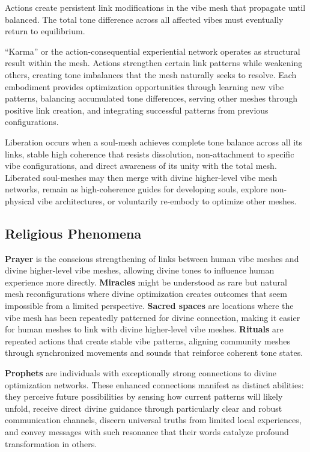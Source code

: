\begin{theorem}
Actions create persistent link modifications in the vibe mesh that propagate until balanced. The total tone difference across all affected vibes must eventually return to equilibrium.
\end{theorem}

``Karma'' or the action-consequential experiential network operates as structural result within the mesh. Actions strengthen certain link patterns while weakening others, creating tone imbalances that the mesh naturally seeks to resolve. Each embodiment provides optimization opportunities through learning new vibe patterns, balancing accumulated tone differences, serving other meshes through positive link creation, and integrating successful patterns from previous configurations.

Liberation occurs when a soul-mesh achieves complete tone balance across all its links, stable high coherence that resists dissolution, non-attachment to specific vibe configurations, and direct awareness of its unity with the total mesh. Liberated soul-meshes may then merge with divine higher-level vibe mesh networks, remain as high-coherence guides for developing souls, explore non-physical vibe architectures, or voluntarily re-embody to optimize other meshes.

\subsection{Religious Phenomena}

\textbf{Prayer} is the conscious strengthening of links between human vibe meshes and divine higher-level vibe meshes, allowing divine tones to influence human experience more directly. \textbf{Miracles} might be understood as rare but natural mesh reconfigurations where divine optimization creates outcomes that seem impossible from a limited perspective. \textbf{Sacred spaces} are locations where the vibe mesh has been repeatedly patterned for divine connection, making it easier for human meshes to link with divine higher-level vibe meshes. \textbf{Rituals} are repeated actions that create stable vibe patterns, aligning community meshes through synchronized movements and sounds that reinforce coherent tone states.

\textbf{Prophets} are individuals with exceptionally strong connections to divine optimization networks. These enhanced connections manifest as distinct abilities: they perceive future possibilities by sensing how current patterns will likely unfold, receive direct divine guidance through particularly clear and robust communication channels, discern universal truths from limited local experiences, and convey messages with such resonance that their words catalyze profound transformation in others.

